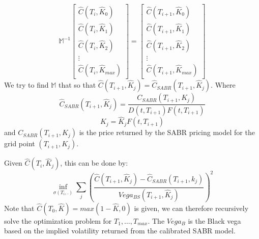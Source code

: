 \documentclass[letterpaper,12pt,titlepage,oneside,final]{book}
\numberwithin{equation}{section}
\theoremstyle{definition}
\begin{document}
\[\mathcal{\mathbb{M}}^{-1} \begin{bmatrix}
	\widehat{C}(T_{i},\widehat{K}_0)\\
	\widehat{C}(T_{i},\widehat{K}_1)\\
	\widehat{C}(T_{i},\widehat{K}_2)\\
	\vdots\\
	\widehat{C}(T_{i},\widehat{K}_{max})
	\end{bmatrix}=
	\begin{bmatrix}
	\widehat{C}(T_{i+1},\widehat{K}_0)\\
	\widehat{C}(T_{i+1},\widehat{K}_1)\\
	\widehat{C}(T_{i+1},\widehat{K}_2)\\
	\vdots\\
	\widehat{C}(T_{i+1},\widehat{K}_{max})
	\end{bmatrix}
	\]
	We try to find $\mathcal{\mathbb{M}}$ that so that $\widehat{C}(T_{i+1},\widehat{K}_j)=\widehat{C}_{SABR}(T_{i+1},\widehat{K}_j)$.
	Where
	\[
	\widehat{C}_{SABR}(T_{i+1},\widehat{K}_j)=\frac{C_{SABR}(T_{i+1},K_j)}{D(t,T_{i+1})F(t,T_{i+1})}
	\]
	\[
	K_j=\widehat{K}_j F(t,T_{i+1})
	\]
	and $C_{SABR}(T_{i+1},K_j)$ is the price returned by the SABR pricing model for the grid point $(T_{i+1},K_j)$.

	Given $\widehat{C}(T_{i},\widehat{K}_j)$, this can be done by:
	\begin{equation}
	\inf_{\sigma(T_i,.)} \sum_{j}(\frac{\widehat{C}(T_{i+1},\widehat{K}_j)-\widehat{C}_{SABR}(T_{i+1},k_j)}{Vega_{BS}(T_{i+1},\widehat{K}_j)})^2
	\label{eq:LVFCal}
 	\end{equation}
	Note that $\widehat{C}(T_0,\widehat{K})=max(1-\widehat{K},0)$ is given, we can therefore recursively solve the optimization problem for $T_1, \dots, T_{max}$. The $Vega_{B}$ is the Black vega based on the implied volatility returned from the calibrated SABR model.
\end{document}
